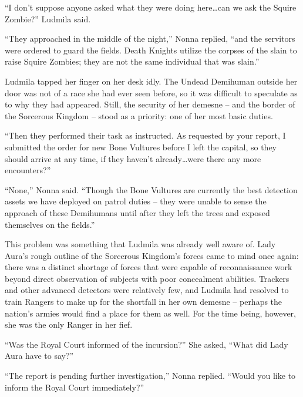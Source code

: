  

“I don’t suppose anyone asked what they were doing here…can we ask the Squire Zombie?” Ludmila said.

 

“They approached in the middle of the night,” Nonna replied, “and the servitors were ordered to guard the fields. Death Knights utilize the corpses of the slain to raise Squire Zombies; they are not the same individual that was slain.”

 

Ludmila tapped her finger on her desk idly. The Undead Demihuman outside her door was not of a race she had ever seen before, so it was difficult to speculate as to why they had appeared. Still, the security of her demesne – and the border of the Sorcerous Kingdom – stood as a priority: one of her most basic duties.

 

“Then they performed their task as instructed. As requested by your report, I submitted the order for new Bone Vultures before I left the capital, so they should arrive at any time, if they haven’t already…were there any more encounters?”

 

“None,” Nonna said. “Though the Bone Vultures are currently the best detection assets we have deployed on patrol duties – they were unable to sense the approach of these Demihumans until after they left the trees and exposed themselves on the fields.”

 

This problem was something that Ludmila was already well aware of. Lady Aura’s rough outline of the Sorcerous Kingdom’s forces came to mind once again: there was a distinct shortage of forces that were capable of reconnaissance work beyond direct observation of subjects with poor concealment abilities. Trackers and other advanced detectors were relatively few, and Ludmila had resolved to train Rangers to make up for the shortfall in her own demesne – perhaps the nation’s armies would find a place for them as well. For the time being, however, she was the only Ranger in her fief.

 

“Was the Royal Court informed of the incursion?” She asked, “What did Lady Aura have to say?”

 

“The report is pending further investigation,” Nonna replied. “Would you like to inform the Royal Court immediately?”

